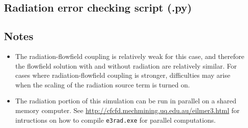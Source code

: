 \topbar

\bottombar

% 

\subsection{Radiation error checking script (.py)}
\topbar

\bottombar

\subsection{Notes}

\begin{itemize}
 \item The radiation-flowfield coupling is relatively weak for this case, and therefore the flowfield solution with and without radiation are relatively similar.
For cases where radiation-flowfield coupling is stronger, difficulties may arise when the scaling of the radiation source term is turned on.
 \item The radiation portion of this simulation can be run in parallel on a shared memory computer.
 See \url{http://cfcfd.mechmining.uq.edu.au/eilmer3.html} for intructions on how to compile \texttt{e3rad.exe} for parallel computations.
\end{itemize}
